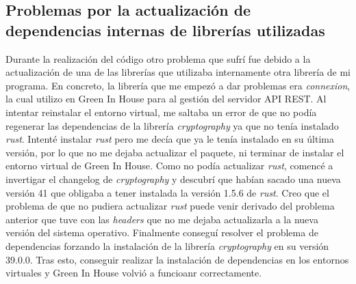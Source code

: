     \subsection{Problemas por la actualización de dependencias internas de  librerías utilizadas}
    Durante la realización del código otro problema que sufrí fue debido a la actualización de una de las librerías que utilizaba internamente otra librería de mi programa. 
    En concreto, la librería que me empezó a dar problemas era \textit{connexion}, la cual utilizo en Green In House para al gestión del servidor API REST. Al intentar reinstalar el entorno virtual, me saltaba un error de que no podía regenerar las dependencias de la librería \textit{cryptography} ya que no tenía instalado \textit{rust}. Intenté instalar \textit{rust} pero me decía que ya le tenía instalado en su última versión, por lo que no me dejaba actualizar el paquete, ni terminar de instalar el entorno virtual de Green In House. Como no podía actualizar \textit{rust}, comencé a invertigar el changelog de \textit{cryptography} y descubrí que habían sacado una nueva versión 41 que obligaba a tener instalada la versión 1.5.6 de \textit{rust}. 
    Creo que el problema de que no pudiera actualizar \textit{rust} puede venir derivado del problema anterior que tuve con las \textit{headers} que no me dejaba actualizarla a la nueva versión del sistema operativo. Finalmente conseguí resolver el problema de dependencias forzando la instalación de la librería \textit{cryptography} en su versión 39.0.0. Tras esto, conseguir realizar la instalación de dependencias en los entornos virtuales y Green In House volvió a funcioanr correctamente.    
    
